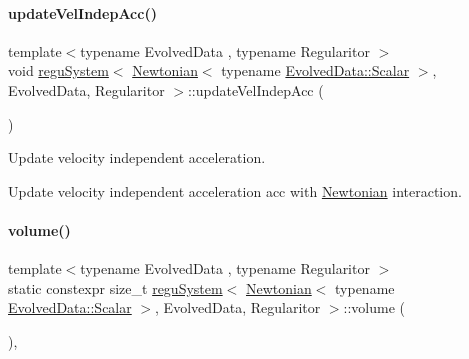 \paragraph{\texorpdfstring{update\+Vel\+Indep\+Acc()}{updateVelIndepAcc()}}
{\footnotesize\ttfamily template$<$typename Evolved\+Data , typename Regularitor $>$ \\
void \mbox{\hyperlink{classregu_system}{regu\+System}}$<$ \mbox{\hyperlink{class_newtonian}{Newtonian}}$<$ typename \mbox{\hyperlink{classregu_system_aca8ee2c387943164ee3ea68370fc3ac0}{Evolved\+Data\+::\+Scalar}} $>$, Evolved\+Data, Regularitor $>$\+::update\+Vel\+Indep\+Acc (\begin{DoxyParamCaption}{ }\end{DoxyParamCaption})\hspace{0.3cm}{\ttfamily [private]}}



Update velocity independent acceleration. 

Update velocity independent acceleration \textquotesingle{}acc\textquotesingle{} with \mbox{\hyperlink{class_newtonian}{Newtonian}} interaction. \mbox{\label{classregu_system_3_01_newtonian_3_01typename_01_evolved_data_1_1_scalar_01_4_00_01_evolved_data_00_01_regularitor_01_4_a6aa04cb165b83702f851a1697936fa23}} 
\paragraph{\texorpdfstring{volume()}{volume()}}
{\footnotesize\ttfamily template$<$typename Evolved\+Data , typename Regularitor $>$ \\
static constexpr size\+\_\+t \mbox{\hyperlink{classregu_system}{regu\+System}}$<$ \mbox{\hyperlink{class_newtonian}{Newtonian}}$<$ typename \mbox{\hyperlink{classregu_system_aca8ee2c387943164ee3ea68370fc3ac0}{Evolved\+Data\+::\+Scalar}} $>$, Evolved\+Data, Regularitor $>$\+::volume (\begin{DoxyParamCaption}{ }\end{DoxyParamCaption})\hspace{0.3cm}{\ttfamily [inline]}, {\ttfamily [static]}}



